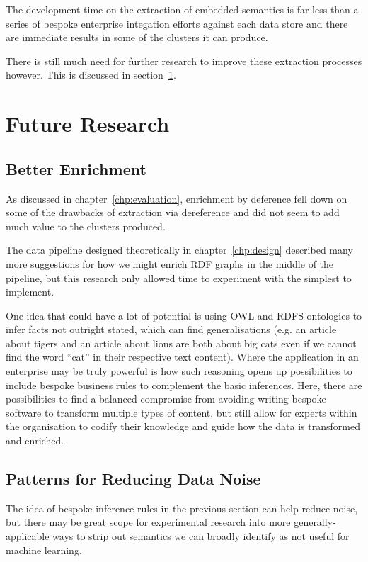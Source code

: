 The development time on the extraction of embedded semantics is
far less than a series of bespoke enterprise integation efforts
against each data store and there are immediate results in some
of the clusters it can produce.

There is still much need for further research to improve these
extraction processes however. This is discussed in section~\ref{sec:con-future}.

\section{Future Research}
\label{sec:con-future}
\subsection{Better Enrichment}

As discussed in chapter~\ref{chp:evaluation}, enrichment by
deference fell down on some of the drawbacks of extraction via
dereference and did not seem to add much value to the clusters
produced.

The data pipeline designed theoretically in chapter~\ref{chp:design}
described many more suggestions for how we might enrich RDF graphs
in the middle of the pipeline, but this research only allowed time
to experiment with the simplest to implement.

One idea that could have a lot of potential is using OWL and RDFS
ontologies to infer facts not outright stated, which can find
generalisations (e.g. an article about tigers and an article about
lions are both about big cats even if we cannot find the word ``cat''
in their respective text content). Where the application in an
enterprise may be truly powerful is how such reasoning opens up
possibilities to include bespoke business rules to complement the
basic inferences. Here, there are possibilities to find a
balanced compromise from avoiding writing bespoke software to
transform multiple types of content, but still allow for experts
within the organisation to codify their knowledge and guide how the
data is transformed and enriched.

\subsection{Patterns for Reducing Data Noise}

The idea of bespoke inference rules in the previous section can help
reduce noise, but there may be great scope for experimental research
into more generally-applicable ways to strip out semantics we can
broadly identify as not useful for machine learning.

